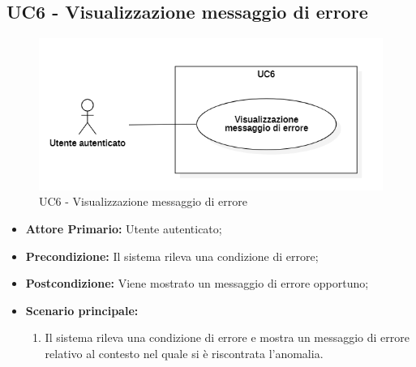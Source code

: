 \subsection{UC6 - Visualizzazione messaggio di errore}
\begin{figure}[H]
    \centering
    \includegraphics[scale = 0.7]{components/img/UC6.png}
    \caption{UC6 - Visualizzazione messaggio di errore}
\end{figure}
\begin{itemize}
\item \textbf{Attore Primario:} Utente autenticato;
\item \textbf{Precondizione:} Il sistema rileva una condizione di errore;
\item \textbf{Postcondizione:} Viene mostrato un messaggio di errore opportuno;
\item \textbf{Scenario principale:}
    \begin{enumerate}
    \item Il sistema rileva una condizione di errore e mostra un messaggio di errore relativo al contesto nel quale si è riscontrata l'anomalia.
    \end{enumerate}
\end{itemize}